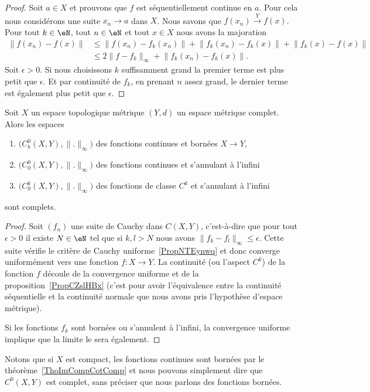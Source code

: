 \begin{proof}
    Soit \( a\in X\) et prouvons que \( f\) est séquentiellement continue en \( a\). Pour cela nous considérons une suite \( x_n\to a\) dans \( X\). Nous savons que \( f(x_n)\stackrel{Y}{\longrightarrow}f(x)\). Pour tout \(k\in \eN\), tout \( n\in \eN\) et tout \( x\in X\) nous avons la majoration
    \begin{subequations}
        \begin{align}
            \big\| f(x_n)-f(x) \big\|&\leq \big\| f(x_n)-f_k(x_n) \big\|+\big\| f_k(x_n)-f_k(x) \big\|+\big\| f_k(x)-f(x) \big\|\\
            &\leq 2\| f-f_k \|_{\infty}+\big\| f_k(x_n)-f_k(x) \big\|.
        \end{align}
    \end{subequations}
    Soit \( \epsilon>0\). Si nous choisissons \( k\) suffisamment grand la premier terme est plus petit que \( \epsilon\). Et par continuité de \( f_k\), en prenant \( n\) assez grand, le dernier terme est également plus petit que \( \epsilon\).
\end{proof}

\begin{proposition} \label{PropSYMEZGU}
    Soit \( X\) un espace topologique métrique \( (Y,d)\) un espace métrique complet. Alors les espaces
    \begin{enumerate}
        \item
            \( \big( C^0_b(X,Y),\| . \|_{\infty} \big)\) des fonctions continues et bornées \( X\to Y\),
        \item
            \( \big( C^0_0(X,Y),\| . \|_{\infty} \big)\) des fonctions continues et s'annulant à l'infini
        \item
            \( \big( C^k_0(X,Y),\| . \|_{\infty} \big)\) des fonctions de classe \( C^k\) et s'annulant à l'infini
    \end{enumerate}
    sont complets.
\end{proposition}

\begin{proof}
    Soit \( (f_n)\) une suite de Cauchy dans \( C(X,Y)\), c'est-à-dire que pour tout \( \epsilon>0\) il existe \( N\in \eN\) tel que si \( k,l>N\) nous avons \( \| f_k-f_l \|_{\infty}\leq \epsilon\). Cette suite vérifie le critère de Cauchy uniforme~\ref{PropNTEynwq} et donc converge uniformément vers une fonction \( f\colon X\to Y\). La continuité (ou l'aspect \( C^k\)) de la fonction \( f\) découle de la convergence uniforme et de la proposition~\ref{PropCZslHBx} (c'est pour avoir l'équivalence entre la continuité séquentielle et la continuité normale que nous avons pris l'hypothèse d'espace métrique).

    Si les fonctions \( f_k\) sont bornées ou s'annulent à l'infini, la convergence uniforme implique que la limite le sera également.
\end{proof}
    Notons que si \( X\) est compact, les fonctions continues sont bornées par le théorème~\ref{ThoImCompCotComp} et nous pouvons simplement dire que \( C^0(X,Y)\) est complet, sans préciser que nous parlons des fonctions bornées.


